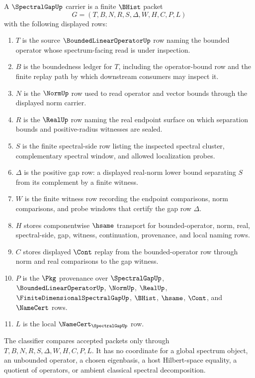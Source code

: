 \begin{definition}
\label{def:spectral-gap-carrier}
A $\SpectralGapUp$ carrier is a finite $\BHist$ packet
$$
G=(T,B,N,R,S,\Delta,W,H,C,P,L)
$$
with the following displayed rows:
\begin{enumerate}
\item $T$ is the source $\BoundedLinearOperatorUp$ row naming the bounded operator whose spectrum-facing read is under inspection.
\item $B$ is the boundedness ledger for $T$, including the operator-bound row and the finite replay path by which downstream consumers may inspect it.
\item $N$ is the $\NormUp$ row used to read operator and vector bounds through the displayed norm carrier.
\item $R$ is the $\RealUp$ row naming the real endpoint surface on which separation bounds and positive-radius witnesses are sealed.
\item $S$ is the finite spectral-side row listing the inspected spectral cluster, complementary spectral window, and allowed localization probes.
\item $\Delta$ is the positive gap row: a displayed real-norm lower bound separating $S$ from its complement by a finite witness.
\item $W$ is the finite witness row recording the endpoint comparisons, norm comparisons, and probe windows that certify the gap row $\Delta$.
\item $H$ stores componentwise $\hsame$ transport for bounded-operator, norm, real, spectral-side, gap, witness, continuation, provenance, and local naming rows.
\item $C$ stores displayed $\Cont$ replay from the bounded-operator row through norm and real comparisons to the gap witness.
\item $P$ is the $\Pkg$ provenance over $\SpectralGapUp$, $\BoundedLinearOperatorUp$, $\NormUp$, $\RealUp$, $\FiniteDimensionalSpectralGapUp$, $\BHist$, $\hsame$, $\Cont$, and $\NameCert$ rows.
\item $L$ is the local $\NameCert_{\SpectralGapUp}$ row.
\end{enumerate}
The classifier compares accepted packets only through $T,B,N,R,S,\Delta,W,H,C,P,L$. It has no coordinate for a global spectrum object, an unbounded operator, a chosen eigenbasis, a host Hilbert-space equality, a quotient of operators, or ambient classical spectral decomposition.
\end{definition}

